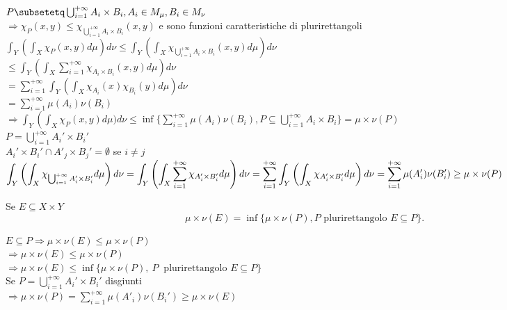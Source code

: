 \documentclass[12px]{article}
\begin{document}
\begin{dimo}
	$P\subsetetq \bigcup^{+\infty}_{i=1}A_i\times B_i, A_i\in M_\mu, B_i\in M_\nu$\\
	$ \Rightarrow  \chi_P(x,y)\leq \chi_{ \bigcup^{+\infty}_{i=1}A_i\times B_i} (x,y)$ e sono funzioni caratteristiche di plurirettangoli\\
	$\displaystyle\int_Y \left(\int_X \chi_P(x,y) d\mu\right)d\nu\leq \int_Y \left(\int_X \chi_{ \bigcup^{+\infty}_{i=1}A_i\times B_i}(x,y)d\mu \right) d\nu$ \\
	$\displaystyle\leq \int_Y \left(\int_X \sum^{+\infty}_{i=1}\chi_{A_i\times B_i} (x,y)d\mu \right) d\nu$\\
	$\displaystyle = \sum^{+\infty}_{i=1}\int_Y \left(\int_X \chi_{A_i}(x)\chi_{B_i}(y)d\mu \right)d\nu$\\
	$\displaystyle = \sum^{+\infty}_{i=1}\mu(A_i)\nu(B_i)$ \\
	$\displaystyle \Rightarrow  \int_Y \left( \int_X \chi_P(x,y)d\mu)d\nu\leq \inf\{ \sum^{+\infty}_{i=1}\mu(A_i)\nu(B_i), P\subseteq \bigcup^{+\infty}_{i=1}A_i\times B_i\} = \mu\times \nu(P)$\\
		$\displaystyle P = \bigcup^{+\infty}_{i=1}A_i'\times B_i'$\\
$A_i'\times B_i'\cap A'_j\times B_j' = \emptyset$ se $i\neq j$ \\
$\displaystyle\int_Y \left(\int_X \chi_{ \bigcup^{+\infty}_{i=1}A'_i\times B_i'}d\mu \right)d\nu\\
=\int_Y \left(\int_X \sum^{+\infty}_{i=1}\chi_{A'_i\times B'_i}d\mu \right) d\nu\\
=\sum^{+\infty}_{i=1}\int_Y \left(\int_X \chi_{A'_i\times B'_i}d\mu \right)d\nu = \sum^{+\infty}_{i=1}\mu(A'_i)\nu(B'_i)\geq \mu\times\nu(P) $
\end{dimo}
\begin{lemm}
	Se $E\subseteq X\times Y$\\
	 \[
		 \mu\times\nu(E) = \inf \{\mu\times\nu (P), P \text{ plurirettangolo } E\subseteq P\}
	 .\] 
\end{lemm}
\begin{dimo}
	$E\subseteq P \Rightarrow  \mu\times\nu (E)\leq \mu\times \nu (P)$ \\
	$ \Rightarrow \mu\times\nu(E)\leq \mu\times \nu(P)$ \\
	$ \Rightarrow \mu\times\nu(E)\leq \inf\{\mu\times\nu(P), \ P\ \text{ plurirettangolo } E\subseteq P\}$ \\
	Se  $P = \bigcup^{+\infty}_{i=1}A_i'\times B_i'$ disgiunti\\
	$ \Rightarrow  \mu\times \nu (P) = \sum^{+\infty}_{i=1}\mu(A'_i)\nu(B_i')\geq \mu\times \nu(E)$
\end{dimo}
\end{document}
